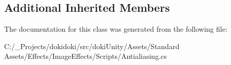 \subsection*{Additional Inherited Members}


The documentation for this class was generated from the following file\+:\begin{DoxyCompactItemize}
\item 
C\+:/\+\_\+\+Projects/dokidoki/src/doki\+Unity/\+Assets/\+Standard Assets/\+Effects/\+Image\+Effects/\+Scripts/Antialiasing.\+cs\end{DoxyCompactItemize}
